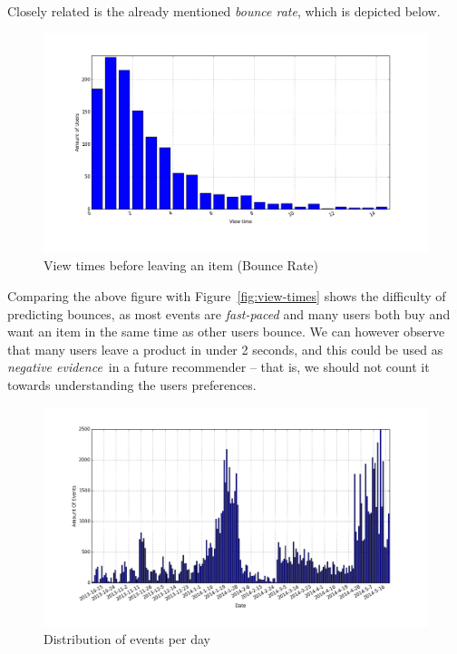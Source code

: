 Closely related is the already mentioned \textit{bounce rate}, which is
depicted below.

\begin{figure}[H]
  \centering
  \includegraphics[width=5in]{image/product_detail_clickeddistribution.png}
  \caption{View times before leaving an item (Bounce Rate)}
  \label{figure:bounceRate}
\end{figure}

Comparing the above figure with Figure~\ref{fig:view-times} shows the
difficulty of predicting bounces, as most events are \textit{fast-paced} and
many users both buy and want an item in the same time as other users bounce.
We can however observe that many users leave a product in under 2 seconds, and
this could be used as \textit{negative evidence} in a future recommender --
that is, we should not count it towards understanding the users preferences.

\begin{figure}[H]
  \centering
  \includegraphics[width=5in]{image/eventsPerDay.png}
  \caption{Distribution of events per day}
  \label{figure:eventOnDaysDist}
\end{figure}

